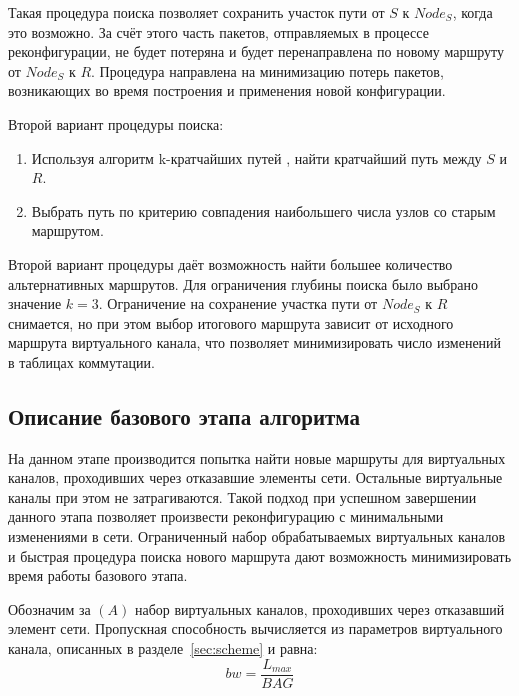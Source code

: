 \documentclass[12pt, a4paper]{article}
\begin{document}
Такая процедура поиска позволяет сохранить участок пути от $S$ к $Node_{S}$, когда это возможно. За счёт этого часть пакетов, отправляемых в процессе реконфигурации, не будет потеряна и будет перенаправлена по новому маршруту от $Node_{S}$ к $R$. Процедура направлена на минимизацию потерь пакетов, возникающих во время построения и применения новой конфигурации.

Второй вариант процедуры поиска:
\begin{enumerate}
	\item Используя алгоритм k-кратчайших путей \cite{kshort}, найти кратчайший путь между $S$ и $R$.
	\item Выбрать путь по критерию совпадения наибольшего числа узлов со старым маршрутом.
\end{enumerate}

Второй вариант процедуры даёт возможность найти большее количество альтернативных маршрутов. Для ограничения глубины поиска было выбрано значение $k = 3$. Ограничение на сохранение участка пути от $Node_{S}$ к $R$ снимается, но при этом выбор итогового маршрута зависит от исходного маршрута виртуального канала, что позволяет минимизировать число изменений в таблицах коммутации.

\subsection{Описание базового этапа алгоритма}

На данном этапе производится попытка найти новые маршруты для виртуальных каналов, проходивших через отказавшие элементы сети. Остальные виртуальные каналы при этом не затрагиваются. Такой подход при успешном завершении данного этапа позволяет произвести реконфигурацию с минимальными изменениями в сети. Ограниченный набор обрабатываемых виртуальных каналов и быстрая процедура поиска нового маршрута дают возможность минимизировать время работы базового этапа.

Обозначим за $(A)$ набор виртуальных каналов, проходивших через отказавший элемент сети. Пропускная способность вычисляется из параметров виртуального канала, описанных в разделе~\ref{sec:scheme} и равна:
$$bw = \frac{L_{max}}{BAG}$$
\end{document}
